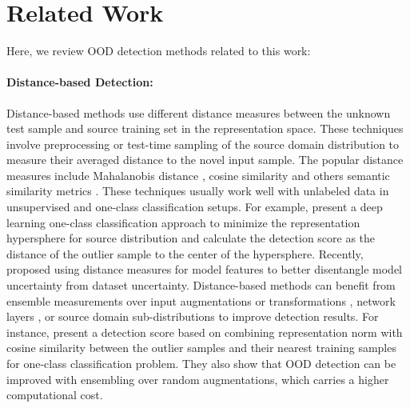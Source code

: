 \documentclass[letterpaper]{article} \usepackage{aaai22}  \usepackage{times}  \usepackage{helvet}  \usepackage{courier}  \usepackage[hyphens]{url}  \usepackage{graphicx} \urlstyle{rm} \def\UrlFont{\rm}  \usepackage{natbib}  \usepackage{caption} \DeclareCaptionStyle{ruled}{labelfont=normalfont,labelsep=colon,strut=off} \frenchspacing  \setlength{\pdfpagewidth}{8.5in}  \setlength{\pdfpageheight}{11in}
\begin{document}
 


\section{Related Work}
\label{sec:background}
Here, we review OOD detection methods related to this work:

\paragraph{Distance-based Detection:} 
Distance-based methods use different distance measures between the unknown test sample and source training set in the representation space. 
These techniques involve preprocessing or test-time sampling of the source domain distribution to measure their averaged distance to the novel input sample.  
The popular distance measures include Mahalanobis distance \cite{lee2018simple,sehwag2021ssd}, cosine similarity \cite{techapanurak2020hyperparameter,tack2020csi} and others semantic similarity metrics \cite{rafiee2020unsupervised}.
These techniques usually work well with unlabeled data in unsupervised and one-class classification setups. 
For example, \citet{ruff2018deep} present a deep learning one-class classification approach to minimize the representation hypersphere for source distribution and calculate the detection score as the distance of the outlier sample to the center of the hypersphere. 
Recently, \citet{mukhoti2021deterministic} proposed using distance measures for model features to better disentangle model uncertainty from dataset uncertainty. 
Distance-based methods can benefit from ensemble measurements over input augmentations \cite{tack2020csi} or transformations \cite{bergman2020classification}, network layers \cite{lee2018simple,sastry2019detecting}, or source domain sub-distributions \cite{oberdiek2020detection} to improve detection results.
For instance, \citet{tack2020csi} present a detection score based on combining representation norm with cosine similarity between the outlier samples and their nearest training samples for one-class classification problem. 
They also show that OOD detection can be improved with ensembling over random augmentations, which carries a higher computational cost. 
\end{document}
